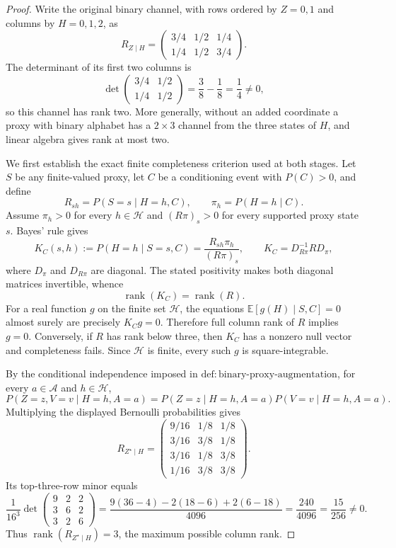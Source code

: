 \documentclass{article}
\begin{document}
\begin{proof}
Write the original binary channel, with rows ordered by \(Z=0,1\) and columns by \(H=0,1,2\), as
\[
 R_{Z\mid H}=
 \begin{pmatrix}
  3/4&1/2&1/4\\
  1/4&1/2&3/4
 \end{pmatrix}.
\]
The determinant of its first two columns is
\[
 \det\!\begin{pmatrix}3/4&1/2\\1/4&1/2\end{pmatrix}
 =\frac{3}{8}-\frac{1}{8}=\frac14\ne0,
\]
so this channel has rank two. More generally, without an added coordinate a proxy with binary alphabet has a \(2\times3\) channel from the three states of \(H\), and linear algebra gives rank at most two.

We first establish the exact finite completeness criterion used at both stages. Let \(S\) be any finite-valued proxy, let \(C\) be a conditioning event with \(P(C)>0\), and define
\[
 R_{sh}=P(S=s\mid H=h,C),\qquad
 \pi_h=P(H=h\mid C).
\]
Assume \(\pi_h>0\) for every \(h\in\mathcal H\) and \((R\pi)_s>0\) for every supported proxy state \(s\). Bayes' rule gives
\[
 K_C(s,h):=P(H=h\mid S=s,C)
 =\frac{R_{sh}\pi_h}{(R\pi)_s},
 \qquad
 K_C=D_{R\pi}^{-1}R D_\pi,
\]
where \(D_\pi\) and \(D_{R\pi}\) are diagonal. The stated positivity makes both diagonal matrices invertible, whence
\[
 \operatorname{rank}(K_C)=\operatorname{rank}(R).
\]
For a real function \(g\) on the finite set \(\mathcal H\), the equations \(\mathbb E[g(H)\mid S,C]=0\) almost surely are precisely \(K_Cg=0\). Therefore full column rank of \(R\) implies \(g=0\). Conversely, if \(R\) has rank below three, then \(K_C\) has a nonzero null vector and completeness fails. Since \(\mathcal H\) is finite, every such \(g\) is square-integrable.

By the conditional independence imposed in \(\mathrm{def{:}binary\text{-}proxy\text{-}augmentation}\), for every \(a\in\mathcal A\) and \(h\in\mathcal H\),
\[
 P(Z=z,V=v\mid H=h,A=a)
 =P(Z=z\mid H=h,A=a)P(V=v\mid H=h,A=a).
\]
Multiplying the displayed Bernoulli probabilities gives
\[
 R_{Z^{\star}\mid H}=
 \begin{pmatrix}
  9/16&1/8&1/8\\
  3/16&3/8&1/8\\
  3/16&1/8&3/8\\
  1/16&3/8&3/8
 \end{pmatrix}.
\]
Its top-three-row minor equals
\[
 \frac{1}{16^3}
 \det\!\begin{pmatrix}9&2&2\\3&6&2\\3&2&6\end{pmatrix}
 =\frac{9(36-4)-2(18-6)+2(6-18)}{4096}
 =\frac{240}{4096}=\frac{15}{256}\ne0.
\]
Thus \(\operatorname{rank}(R_{Z^{\star}\mid H})=3\), the maximum possible column rank.


\end{proof}
\end{document}
